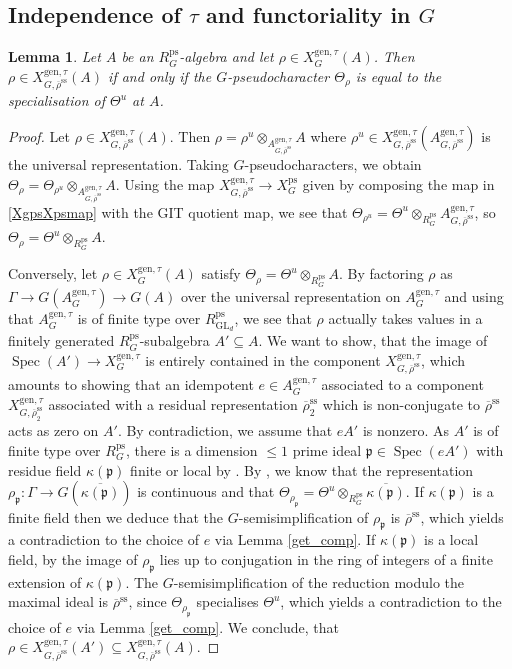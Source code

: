 \documentclass{amsart}
\newtheorem{lem}[prop]{Lemma}
\theoremstyle{definition}
\theoremstyle{remark}
\DeclareMathOperator{\GL}{GL}
\DeclareMathOperator{\Spec}{Spec}
\newcommand{\pp}{\mathfrak p}
\newcommand{\rhobar}{\overline{\rho}}
\newcommand{\ps}{\mathrm{ps}}
\newcommand{\gen}{\mathrm{gen}}
\newcommand{\RpsGLd}{R^{\ps}_{\GL_d}}
\newcommand{\RpsG}{R^{\ps}_G}
\newcommand{\XgenGtau}{X^{\gen, \tau}_G}
\newcommand{\XgenGtaurhobarss}{X^{\gen, \tau}_{G,\rhobarss}}
\newcommand{\rhobarss}{\rhobar^{\mathrm{ss}}}
\newcommand{\AgenGtau}{A^{\gen, \tau}_G}
\newcommand{\AgenGtaurhobarss}{A^{\gen, \tau}_{G, \rhobarss}}
\begin{document}
\subsection{\texorpdfstring{Independence of $\tau$ and functoriality in $G$}{Independence of tau and functoriality in G}}\label{ind_funct}


\begin{lem}\label{Gps_comp} Let $A$ be an $\RpsG$-algebra and let $\rho\in X^{\gen, \tau}_{G}(A)$. Then 
$\rho\in X^{\gen, \tau}_{G,\rhobarss}(A)$ if and only if the $G$-pseudocharacter $\Theta_{\rho}$ is equal to the specialisation of $\Theta^u$ at $A$.
\end{lem}

\begin{proof} Let $\rho \in \XgenGtaurhobarss(A)$.
    Then $\rho = \rho^u \otimes_{\AgenGtaurhobarss} A$ where $\rho^u \in \XgenGtaurhobarss(\AgenGtaurhobarss)$ is the universal representation.
    Taking $G$-pseudocharacters, we obtain $\Theta_{\rho} = \Theta_{\rho^u} \otimes_{\AgenGtaurhobarss} A$.
    Using the map $\XgenGtaurhobarss \to X^{\ps}_G$ given by composing the map in \eqref{XgpsXpsmap} with the GIT quotient map, we see that $\Theta_{\rho^u} = \Theta^u \otimes_{R^{\ps}_G} \AgenGtaurhobarss$, so $\Theta_{\rho} = \Theta^u \otimes_{R^{\ps}_G} A$.
    
    Conversely, let $\rho \in \XgenGtau(A)$ satisfy $\Theta_{\rho} = \Theta^u \otimes_{R^{\ps}_G} A$.
    By factoring $\rho$ as $\Gamma \to G(\AgenGtau) \to G(A)$ over the universal representation on $\AgenGtau$ and using that $\AgenGtau$ is of finite type over $\RpsGLd$, we see that $\rho$ actually takes values in a finitely generated $\RpsG$-subalgebra $A' \subseteq A$.
    We want to show, that the image of $\Spec(A') \to \XgenGtau$ is entirely contained in the component $\XgenGtaurhobarss$, which amounts to showing that an idempotent $e \in \AgenGtau$ associated to a component $X^{\gen, \tau}_{G, \rhobarss_2}$ associated with a residual representation $\rhobarss_2$ which is non-conjugate to $\rhobarss$ acts as zero on $A'$. By contradiction, we assume that $eA'$ is nonzero. As $A'$ is of finite type over $R^{\ps}_G$, there is a dimension $\leq 1$ prime ideal $\pp \in \Spec(eA')$ with residue field $\kappa(\pp)$ finite or local by \cite[Lemma 3.17]{BIP_new}.
    By , we know that the representation $\rho_{\pp} : \Gamma \to G(\overline{\kappa(\pp)})$ is continuous and that $\Theta_{\rho_{\pp}} = \Theta^u \otimes_{R^{\ps}_G} \overline{\kappa(\pp)}$. If $\kappa(\pp)$ is a finite field then we deduce that the $G$-semisimplification 
    of $\rho_{\pp}$ is $\rhobarss$, which yields a contradiction to the choice of $e$ via Lemma \ref{get_comp}.
    If $\kappa(\pp)$ is a local field, by  the image of $\rho_{\pp}$ lies up to conjugation in the ring of integers of a finite extension of $\kappa(\pp)$. The $G$-semisimplification of the reduction 
    modulo the maximal ideal is $\rhobarss$, since $\Theta_{\rho_{\pp}}$ specialises $\Theta^u$, which yields a contradiction to the choice of $e$ via Lemma \ref{get_comp}. 
    We conclude, that $\rho \in \XgenGtaurhobarss(A')\subseteq \XgenGtaurhobarss(A)$.
\end{proof}
\end{document}
